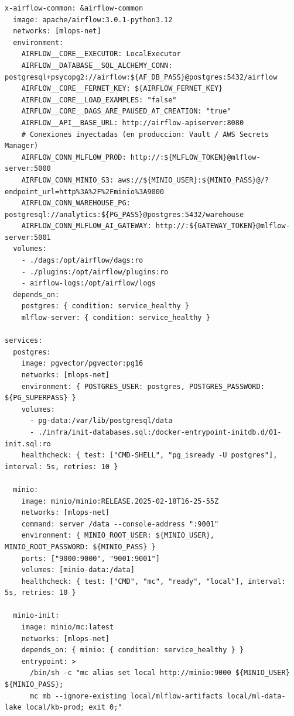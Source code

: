 \begin{lstlisting}[style=yaml, basicstyle=\ttfamily\scriptsize\color{CodeIdentifier}, caption={Stack de referencia \code{docker-compose.yml} integrando PostgreSQL/pgvector, MinIO, MLflow 3 y Apache Airflow 3.}, label={lst:docker-compose-stack}]
x-airflow-common: &airflow-common
  image: apache/airflow:3.0.1-python3.12
  networks: [mlops-net]
  environment:
    AIRFLOW__CORE__EXECUTOR: LocalExecutor
    AIRFLOW__DATABASE__SQL_ALCHEMY_CONN: postgresql+psycopg2://airflow:${AF_DB_PASS}@postgres:5432/airflow
    AIRFLOW__CORE__FERNET_KEY: ${AIRFLOW_FERNET_KEY}
    AIRFLOW__CORE__LOAD_EXAMPLES: "false"
    AIRFLOW__CORE__DAGS_ARE_PAUSED_AT_CREATION: "true"
    AIRFLOW__API__BASE_URL: http://airflow-apiserver:8080
    # Conexiones inyectadas (en produccion: Vault / AWS Secrets Manager)
    AIRFLOW_CONN_MLFLOW_PROD: http://:${MLFLOW_TOKEN}@mlflow-server:5000
    AIRFLOW_CONN_MINIO_S3: aws://${MINIO_USER}:${MINIO_PASS}@/?endpoint_url=http%3A%2F%2Fminio%3A9000
    AIRFLOW_CONN_WAREHOUSE_PG: postgresql://analytics:${PG_PASS}@postgres:5432/warehouse
    AIRFLOW_CONN_MLFLOW_AI_GATEWAY: http://:${GATEWAY_TOKEN}@mlflow-server:5001
  volumes:
    - ./dags:/opt/airflow/dags:ro
    - ./plugins:/opt/airflow/plugins:ro
    - airflow-logs:/opt/airflow/logs
  depends_on:
    postgres: { condition: service_healthy }
    mlflow-server: { condition: service_healthy }

services:
  postgres:
    image: pgvector/pgvector:pg16
    networks: [mlops-net]
    environment: { POSTGRES_USER: postgres, POSTGRES_PASSWORD: ${PG_SUPERPASS} }
    volumes:
      - pg-data:/var/lib/postgresql/data
      - ./infra/init-databases.sql:/docker-entrypoint-initdb.d/01-init.sql:ro
    healthcheck: { test: ["CMD-SHELL", "pg_isready -U postgres"], interval: 5s, retries: 10 }

  minio:
    image: minio/minio:RELEASE.2025-02-18T16-25-55Z
    networks: [mlops-net]
    command: server /data --console-address ":9001"
    environment: { MINIO_ROOT_USER: ${MINIO_USER}, MINIO_ROOT_PASSWORD: ${MINIO_PASS} }
    ports: ["9000:9000", "9001:9001"]
    volumes: [minio-data:/data]
    healthcheck: { test: ["CMD", "mc", "ready", "local"], interval: 5s, retries: 10 }

  minio-init:
    image: minio/mc:latest
    networks: [mlops-net]
    depends_on: { minio: { condition: service_healthy } }
    entrypoint: >
      /bin/sh -c "mc alias set local http://minio:9000 ${MINIO_USER} ${MINIO_PASS};
      mc mb --ignore-existing local/mlflow-artifacts local/ml-data-lake local/kb-prod; exit 0;"


\end{lstlisting}
